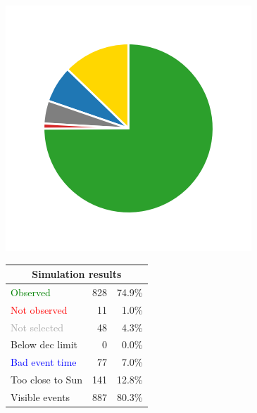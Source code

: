 \begin{colsection}
\begin{colsection}
\begin{figure}[p]
\begin{center}
    \begin{minipage}[t]{0.2\textwidth}\vspace{10pt}
    \includegraphics[width=\linewidth]{images/gw_sims/2n8+2k8_pie.png}
    \end{minipage}
    \begin{minipage}[t]{0.37\textwidth}\vspace{0pt}
    \begin{tabular}{lrr}
    \multicolumn{3}{c}{\textbf{Simulation results}} \\
    \midrule
    \textcolor{Green}{Observed} & 828 & 74.9\% \\
    \textcolor{Red}{Not observed} & 11 & 1.0\% \\
    \textcolor{darkgray}{Not selected} & 48 & 4.3\% \\
    \textcolor{NavyBlue}{Below dec limit} & 0 & 0.0\% \\
    \textcolor{Blue}{Bad event time} & 77 & 7.0\% \\
    \textcolor{BurntOrange}{Too close to Sun} & 141 & 12.8\% \\
    \midrule
    Visible events & 887 &  80.3\% \\
    \end{tabular}
    \end{minipage}

\end{center}
\end{figure}
\end{colsection}
\end{colsection}
